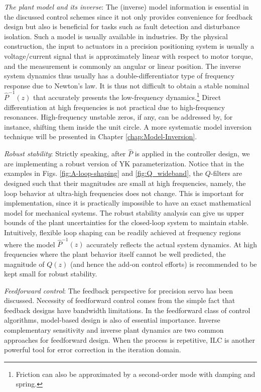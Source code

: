 \documentclass [11pt, proquest] {uwthesis}[2020/02/24]
\begin{document}
\label{sec:comments}\emph{The plant model and its inverse}: The
(inverse) model information is essential in the discussed control
schemes since it not only provides convenience for feedback design
but also is beneficial for tasks such as fault detection and disturbance
isolation. Such a model is usually available in industries. By the
physical construction, the input to actuators in a precision positioning
system is usually a voltage/current signal that is approximately linear
with respect to motor torque, and the measurement is commonly an angular
or linear position. The inverse system dynamics thus usually has a
double-differentiator type of frequency response due to Newton's law.
It is thus not difficult to obtain a stable nominal $\hat{P}^{-1}(z)$
that accurately presents the low-frequency dynamics.\footnote{Friction can also be approximated by a second-order mode with damping
and spring.} Direct differentiation at high frequencies is not practical due to
high-frequency resonances. High-frequency unstable zeros, if any,
can be addressed by, for instance, shifting them inside the unit circle. A more systematic model inversion technique will be presented in Chapter \ref{chap:Model-Inversion}.

\emph{Robust stability}:\emph{ }Strictly speaking, after $\hat{P}$
is applied in the controller design, we are implementing a robust
version of YK parameterization. Notice that in the examples in Figs.
\ref{fig:A-loop-shaping} and \ref{fig:Q_wideband}, the $Q$-filters
are designed such that their magnitudes are small at high frequencies,
namely, the loop behavior at ultra-high frequencies does not change.
This is important for implementation, since it is practically impossible
to have an exact mathematical model for mechanical systems. The robust
stability analysis can give us upper bounds of the plant uncertainties
for the closed-loop system to maintain stable. Intuitively, flexible
loop shaping can be readily achieved at frequency regions where the
model $\hat{P}^{-1}(z)$ accurately reflects the actual system dynamics.
At high frequencies where the plant behavior itself cannot be well
predicted, the magnitude of $Q(z)$ (and hence the add-on control
efforts) is recommended to be kept small for robust stability. 

\emph{Feedforward control}: The feedback perspective for precision
servo has been discussed. Necessity
of feedforward control comes from the simple fact that feedback designs have
bandwidth limitations. In the feedforward class of control algorithms, model-based
design is also of essential importance. Inverse complementary sensitivity
and inverse plant dynamics are two common approaches for feedforward design.
When the process is repetitive, ILC is
another powerful tool for error correction in the iteration domain.\emph{}
\end{document}
